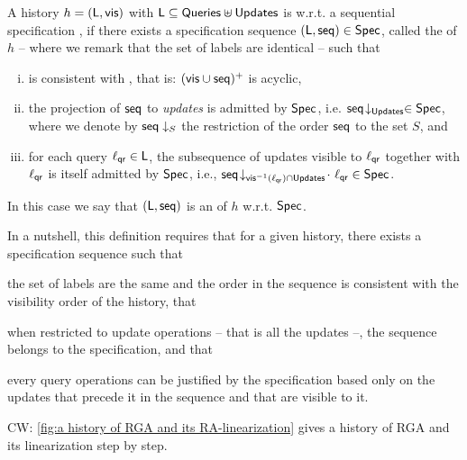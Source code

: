 \begin{definition}
  \label{definition:ralinearizability1} A history $h =
  (\mathsf{L},\mathsf{vis})$ with $\mathsf{L}\subseteq \mathsf{Queries}\uplus\mathsf{Updates}$ is \crdtlinearizable{} w.r.t. a
   sequential specification
  \Spec{}, if there exists a specification sequence
  $(\mathsf{L}, \mathsf{seq}) \in \mathsf{Spec}{}$, called the
  \emph{\crdtlinearization{}} of $h$ -- where we remark that the set of labels
  are identical -- such that %
  \begin{enumerate}[(i)]
  \item \aseqord{} is consistent with  \avisord{}, that is: $(\mathsf{vis}
    \cup \mathsf{seq})^{+}$ is acyclic,
  \item the projection of $\mathsf{seq}$ to \emph{updates} is
    admitted by $\mathsf{Spec}$, i.e.
    $\mathsf{seq}\!\downarrow_{\mathsf{Updates}} \in \mathsf{Spec}$, where we denote by
    $\mathsf{seq}\downarrow_{S}$ the restriction of the order $\mathsf{seq}$ to
    the set $S$, and
  \item\label{it:query} for each query $\ell_{\mathsf{qr}}\in \mathsf{L}$, the subsequence of updates visible to $\ell_{\mathsf{qr}}$ together with $\ell_{\mathsf{qr}}$ is itself admitted by $\mathsf{Spec}$, i.e., $\mathsf{seq}\!\downarrow_{\mathsf{vis}^{-1}(\ell_{\mathsf{qr}})\cap \mathsf{Updates}}\!\cdot\
    \ell_{\mathsf{qr}} \in \mathsf{Spec}$.
\end{enumerate}
In this case we say that $(\mathsf{L}, \mathsf{seq})$ is an \emph{\crdtlinearization{}} of $h$ w.r.t. $\mathsf{Spec}{}$.
\end{definition}

In a nutshell, this definition requires that for a given
history, there exists a specification sequence such
that
\begin{inparaenum}[(i)]
\item the set of labels are the same and the order in the sequence is
  consistent with the visibility order of the history, that
\item when restricted to update operations -- that is all the updates --, the sequence belongs to
  the specification, and that
\item every query operations can be justified by the specification based only
  on the updates that precede it in the sequence and that are visible
  to it.
\end{inparaenum}

 {\color {red}CW: \autoref{fig:a history of RGA and its RA-linearization} gives a history of RGA and its linearization step by step.}

